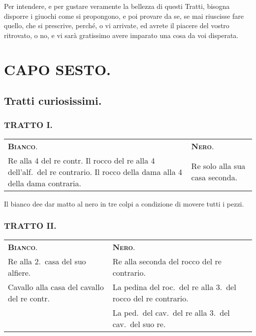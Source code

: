 \documentclass[11pt,a6paper]{article}
\begin{document}
Per intendere, e per gustare veramente
la bellezza di questi Tratti, bisogna disporre
i giuochi come si propongono, e poi provare
da se, se mai riuscisse fare quello, che si
prescrive, perché, o vi arrivate, ed avrete il
piacere del vostro ritrovato, o no, e vi sarà
gratissimo avere imparato una cosa da voi
disperata.


\section{CAPO SESTO.}

\subsection{Tratti curiosissimi.}

\subsubsection{TRATTO I.}

{\small
\noindent
\begin{tabular}{@{}p{3.84cm}p{3.84cm}}
{\bfseries\scshape Bianco}.& {\bfseries\scshape Nero}.\\
Re alla 4 del re contr.
Il rocco del re alla 4 dell'alf.\ del re contrario.
Il rocco della dama alla
4 della dama contraria.& Re solo alla sua casa seconda.\\
\end{tabular}}

Il bianco dee dar matto al nero in tre colpi a condizione di movere tutti i pezzi.


\subsubsection{TRATTO II.}
{\small
\noindent
\begin{tabular}{@{}p{3.84cm}p{3.84cm}}
{\bfseries\scshape Bianco}. & {\bfseries\scshape Nero}.\\
Re alla 2.\ casa del suo alfiere.&Re alla seconda del rocco del re contrario.\\
Cavallo alla casa del cavallo del re contr.& La pedina del roc.\ del re alla 3.\ del rocco del re contrario.\\
& La ped.\ del cav.\ del re alla 3.\ del cav.\ del suo re.
\end{tabular}}
\end{document}
